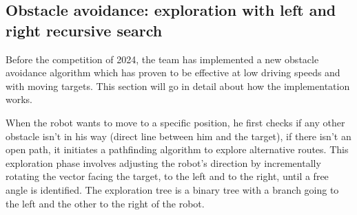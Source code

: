 \subsection{Obstacle avoidance: exploration with left and right recursive search}
Before the competition of 2024, the team has implemented a new obstacle avoidance algorithm which has
proven to be effective at low driving speeds and with moving targets. This section will go in detail about how the implementation works.

When the robot wants to move to a specific position, he first checks if any other obstacle isn't in his way (direct line between him and the target), if there isn't an open path, it initiates a pathfinding algorithm to explore alternative routes. This exploration phase involves adjusting the robot's direction by incrementally rotating the vector facing the target, to the left and to the right, until a free angle is identified. The exploration tree is a binary tree with a branch going to the left and the other to the right of the robot.

